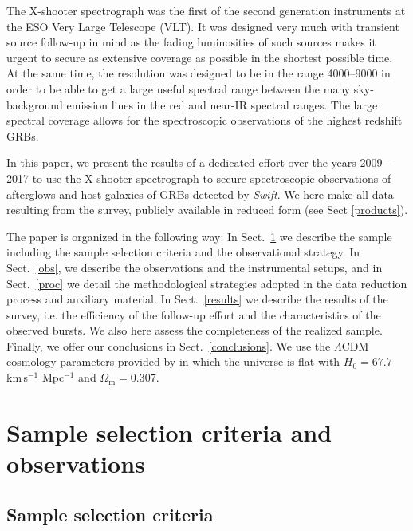 \documentclass{aa}    %
\begin{document}
The X-shooter spectrograph \citep{Vernet2011} was the first of the second
generation instruments at the ESO Very Large Telescope (VLT). It was designed
very much with transient source follow-up in mind as the fading luminosities of
such sources makes it urgent to secure as extensive coverage as possible in the
shortest possible time. At the same time, the resolution was designed to be in
the range 4000--9000 in order to be able to get a large useful spectral range
between the many sky-background emission lines in the red and near-IR spectral
ranges. The large spectral coverage allows for the spectroscopic observations of
the highest redshift GRBs.

In this paper, we present the results of a dedicated effort over the years 2009
-- 2017 to use the X-shooter spectrograph to secure spectroscopic observations
of afterglows and host galaxies of GRBs detected by {\it Swift}. We here make
all data resulting from the survey, publicly available in reduced form (see Sect
\ref{products}).

The paper is organized in the following way: In Sect.~\ref{sample} we describe
the sample including the sample selection criteria and the observational
strategy. In Sect.~\ref{obs}, we describe the observations and the instrumental
setups, and in Sect.~\ref{proc} we detail the methodological strategies adopted
in the data reduction process and auxiliary material. In Sect.~\ref{results} we
describe the results of the survey, i.e. the efficiency of the follow-up effort
and the characteristics of the observed bursts. We also here assess the
completeness of the realized sample. Finally, we offer our conclusions
in Sect.~\ref{conclusions}. We use the $\Lambda$CDM cosmology parameters
provided by \citet{Planck2015} in which the universe is flat with $H_0 =
67.7$\,km\,s$^{-1}$ Mpc$^{-1}$ and $\Omega_\mathrm{m} = 0.307$.


\section{Sample selection criteria and observations}\label{sample}



\subsection{Sample selection criteria} \label{samplecrit}
\end{document}
